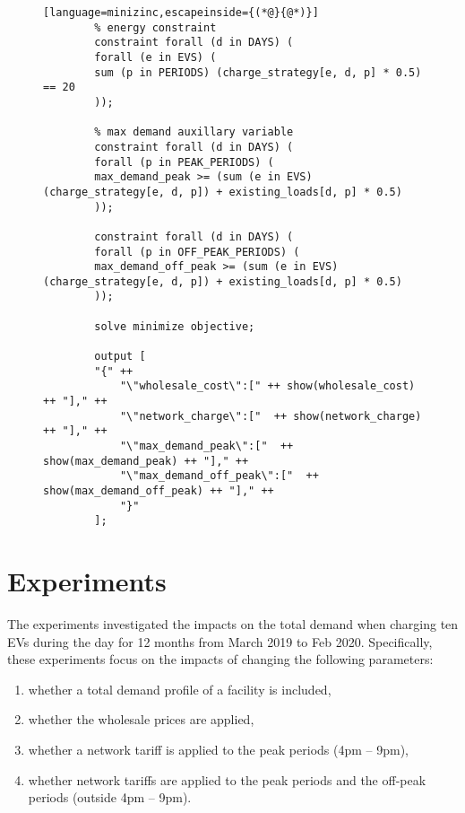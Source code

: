 \documentclass[a4paper]{llncs}
\begin{document}
\begin{figure}[hp!]
\begin{lstlisting}[language=minizinc,escapeinside={(*@}{@*)}]
		% energy constraint
		constraint forall (d in DAYS) (
		forall (e in EVS) (
		sum (p in PERIODS) (charge_strategy[e, d, p] * 0.5) == 20
		));
		
		% max demand auxillary variable
		constraint forall (d in DAYS) (
		forall (p in PEAK_PERIODS) (
		max_demand_peak >= (sum (e in EVS) (charge_strategy[e, d, p]) + existing_loads[d, p] * 0.5)
		));
		
		constraint forall (d in DAYS) (
		forall (p in OFF_PEAK_PERIODS) (
		max_demand_off_peak >= (sum (e in EVS) (charge_strategy[e, d, p]) + existing_loads[d, p] * 0.5)
		));
		
		solve minimize objective;
		
		output [
		"{" ++
			"\"wholesale_cost\":[" ++ show(wholesale_cost) ++ "]," ++
			"\"network_charge\":["  ++ show(network_charge) ++ "]," ++
			"\"max_demand_peak\":["  ++ show(max_demand_peak) ++ "]," ++
			"\"max_demand_off_peak\":["  ++ show(max_demand_off_peak) ++ "]," ++
			"}"
		];
	\end{lstlisting}
\end{figure}


\section{Experiments}

The experiments investigated the impacts on the total demand when charging ten EVs during the day for 12 months from March 2019 to Feb 2020. Specifically, these experiments focus on the impacts of changing the following parameters:

\begin{enumerate}
	\item whether a total demand profile of a facility is included,
	\item whether the wholesale prices are applied,
	\item whether a network tariff is applied to the peak  periods (4pm -- 9pm),
	\item whether network tariffs are applied to the peak periods and the off-peak periods (outside 4pm -- 9pm).
\end{enumerate}
\end{document}
